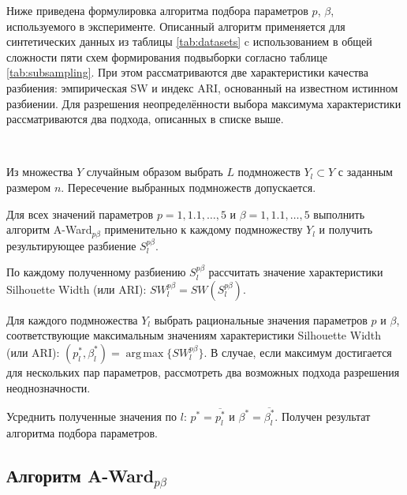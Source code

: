 \documentclass[12pt]{a&t}
\begin{document}
Ниже приведена формулировка алгоритма подбора параметров $ p $, $ \beta $, используемого в эксперименте. Описанный алгоритм применяется для синтетических данных из таблицы \ref{tab:datasets} c использованием в общей сложности пяти схем формирования подвыборки согласно таблице \ref{tab:subsampling}. При этом рассматриваются две характеристики качества разбиения: эмпирическая SW и индекс ARI, основанный на известном истинном разбиении. Для разрешения неопределённости выбора максимума характеристики рассматриваются два подхода, описанных в списке выше.

\begin{algorithm} \label{alg:experiment}
	\
	\begin{enumlist}[.] 
		\item
		Из множества $ Y $ случайным образом выбрать $ L $ подмножеств $ Y_l \subset Y $ с заданным размером $ n $. Пересечение выбранных подмножеств допускается.
		
		\item
		Для всех значений параметров $ p=1,1.1,\ldots,5 $ и $ \beta=1,1.1,\ldots,5 $ выполнить алгоритм \mbox{A-Ward$ _{p\beta} $} применительно к каждому подмножеству  $ Y_l $ и получить результирующее разбиение $ S_l^{p\beta} $.
		
		\item
		По каждому полученному разбиению  $ S_l^{p\beta} $ рассчитать значение характеристики Silhouette Width (или ARI): $ SW_l^{p\beta} = SW(S_l^{p\beta}) $.
		
		\item
		Для каждого подмножества $ Y_l $ выбрать рациональные значения параметров $ p $ и $ \beta $, соответствующие максимальным значениям характеристики Silhouette Width (или ARI): $ (p^*_l,\beta^*_l)=\operatorname{arg\,max}\{SW_l^{p\beta}\} $. В случае, если максимум достигается для нескольких пар параметров, рассмотреть два возможных подхода разрешения неоднозначности. 
		
		\item Усреднить полученные значения по $ l $: $ p^* = \overline{p^*_l} $ и $ \beta^* = \overline{\beta^*_l} $. Получен результат алгоритма подбора параметров.
		
	\end{enumlist}
\end{algorithm}

\subsection{Алгоритм \mbox{A-Ward$ _{p\beta} $}} \label{sec:a-ward-p-beta}
\end{document}
